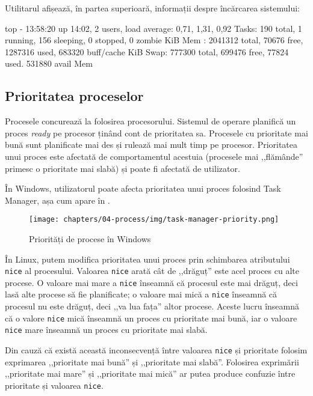 Utilitarul  afișează, în partea superioară, informații despre încărcarea sistemului:

\begin{screen}
top - 13:58:20 up 14:02,  2 users,  load average: 0,71, 1,31, 0,92
Tasks: 190 total,   1 running, 156 sleeping,   0 stopped,   0 zombie
KiB Mem :  2041312 total,    70676 free,  1287316 used,   683320 buff/cache
KiB Swap:   777300 total,   699476 free,    77824 used.
  531880 avail Mem
\end{screen}

\subsection{Prioritatea proceselor}
\label{sec:process:priority}

Procesele concurează la folosirea procesorului.
Sistemul de operare planifică un proces \textit{ready} pe procesor ținând cont de prioritatea sa.
Procesele cu prioritate mai bună sunt planificate mai des și rulează mai mult timp pe procesor.
Prioritatea unui proces este afectată de comportamentul acestuia (procesele mai ,,flămânde'' primesc o prioritate mai slabă) și poate fi afectată de utilizator.

În Windows, utilizatorul poate afecta prioritatea unui proces folosind Task Manager, așa cum apare în .

\begin{figure}[!htbp]
  \centering
  \texttt{[image: chapters/04-process/img/task-manager-priority.png]}
  \caption{Priorități de procese în Windows}
  \label{fig:process:priority-task-manager}
\end{figure}

În Linux, putem modifica prioritatea unui proces prin schimbarea atributului \texttt{nice} al procesului.
Valoarea \texttt{nice} arată cât de ,,drăguț'' este acel proces cu alte procese.
O valoare mai mare a \texttt{nice} înseamnă că procesul este mai drăguț, deci lasă alte procese să fie planificate;
o valoare mai mică a \texttt{nice} înseamnă că procesul nu este drăguț, deci ,,va lua fața'' altor procese.
Aceste lucru înseamnă că o valore \texttt{nice} mică înseamnă un proces cu prioritate mai bună, iar o valoare \texttt{nice} mare înseamnă un proces cu prioritate mai slabă.

\begin{note}
  Din cauză că există această inconsecvență între valoarea \texttt{nice} și prioritate folosim exprimarea ,,prioritate mai bună'' și ,,prioritate mai slabă''.
  Folosirea exprimării ,,prioritate mai mare'' și ,,prioritate mai mică'' ar putea produce confuzie între prioritate și valoarea \texttt{nice}.
\end{note}

